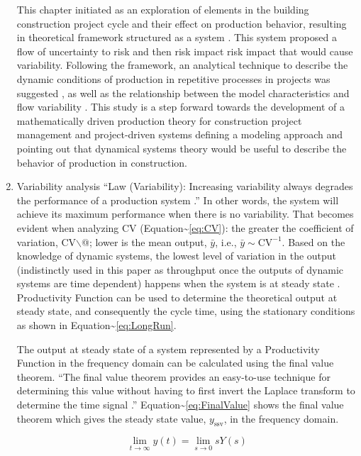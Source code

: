 \documentclass{article}
\begin{document}
\begin{enumerate}
This chapter initiated as an exploration of elements in the building construction project cycle and their effect on production behavior, resulting in theoretical framework structured as a system \citep{Antunes2015a}.
This system proposed a flow of uncertainty to risk and then risk impact risk impact that would cause variability.
Following the framework, an analytical technique to describe the dynamic conditions of production in repetitive processes in projects was suggested \citep{Antunes2015}, as well as the relationship between the model characteristics and flow variability \citep{Antunes2016}.
This study is a step forward towards the development of a mathematically driven production theory for construction project management and project-driven systems defining a modeling approach and pointing out that dynamical systems theory would be useful to describe the behavior of production in construction.

\item Variability analysis
\label{sec:orgd7dcc6f}
``Law (Variability): Increasing variability always degrades the performance of a production system \citep{Hopp2001}.''
In other words, the system will achieve its maximum performance when there is no variability.
That becomes evident when analyzing CV (Equation\textasciitilde{}\ref{eq:CV}): the greater the coefficient of variation, CV$\backslash$@; lower is the mean output, \(\bar{y}\), i.e., \(\bar{y} \sim \mbox{CV}^{-1}\).
Based on the knowledge of dynamic systems, the lowest level of variation in the output (indistinctly used in this paper as throughput once the outputs of dynamic systems are time dependent) happens when the system is at steady state \citep{Nise2010,Ogata2010}.
Productivity Function can be used to determine the theoretical output at steady state, and consequently the cycle time, using the stationary conditions as shown in Equation\textasciitilde{}\ref{eq:LongRun}.

The output at steady state of a system represented by a Productivity Function in the frequency domain can be calculated using the final value theorem.
``The final value theorem provides an easy-to-use technique for determining this value without having to first invert the Laplace transform to determine the time signal \citep[p.97]{Chen2007}.''
Equation\textasciitilde{}\ref{eq:FinalValue} shows the final value theorem which gives the steady state value, \(y_{\mbox{ssv}}\), in the frequency domain.

\begin{equation}\label{eq:FinalValue}
	\lim_{t\rightarrow \infty} y(t)=\lim_{s\rightarrow 0} sY(s)
\end{equation}


\end{enumerate}
\end{document}
